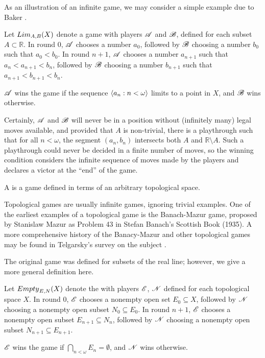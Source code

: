 As an illustration of an infinite game, we may consider a simple example due to
Baker \cite{noMRbaker}.

\begin{game}
  Let ${Lim}_{A,B}(X)$ denote a game with players $\mathscr{A}$ and $\mathscr{B}$,
  defined for each subset $A\subset \mathbb{R}$.
  In round $0$, $\mathscr{A}$ chooses a number $a_0$, followed by $\mathscr{B}$ choosing
  a number $b_0$ such that $a_0<b_0$.
  In round $n+1$, $\mathscr{A}$ chooses a number $a_{n+1}$ such that
  $a_n<a_{n+1}<b_n$, followed by $\mathscr{B}$ choosing a number $b_{n+1}$ such that
  $a_{n+1}<b_{n+1}<b_n$.

  $\mathscr{A}$ wins the game if the sequence $\langle a_n:n<\omega\rangle$ limits to a
  point in $X$, and $\mathscr{B}$ wins otherwise.
\end{game}

Certainly, $\mathscr{A}$ and $\mathscr{B}$ will never be in
a position without (infinitely many) legal moves available, and provided that
$A$ is non-trivial, there is a playthrough such that for all $n<\omega$,
the segment $(a_n,b_n)$ intersects both $A$ and $\mathbb{R}\setminus A$.
Such a playthrough could never be decided in a finite number of moves,
so the winning condition considers the infinite sequence of moves made by the
players and declares a victor at the ``end'' of the game.

\begin{defn}
  A  is a game defined in terms of an arbitrary
  topological space.
\end{defn}

Topological games are usually infinite games, ignoring trivial examples.
One of the earliest examples
of a topological game is the Banach-Mazur game, proposed by Stanislaw Mazur
as Problem 43 in Stefan Banach's Scottish Book (1935). A more comprehensive
history of the Banacy-Mazur and other topological games may be found in
Telgarsky's survey on the subject \cite{MR892457}.

The original game was defined for subsets of the real line; however,
we give a more general definition here.

\begin{game}
  Let ${Empty}_{E,N}(X)$ denote the  with players $\mathscr{E}$,
  $\mathscr{N}$ defined for each topological space $X$.
  In round $0$, $\mathscr{E}$ chooses a nonempty open set $E_0\subseteq X$, followed
  by $\mathscr{N}$ choosing a nonempty open subset $N_0\subseteq E_0$.
  In round $n+1$, $\mathscr{E}$ chooses a nonempty open subset $E_{n+1}\subseteq N_n$,
  followed by $\mathscr{N}$ choosing a nonempty open subset
  $N_{n+1}\subseteq E_{n+1}$.

  $\mathscr{E}$ wins the game if $\bigcap_{n<\omega} E_n = \emptyset$,
  and $\mathscr{N}$ wins otherwise.
\end{game}

